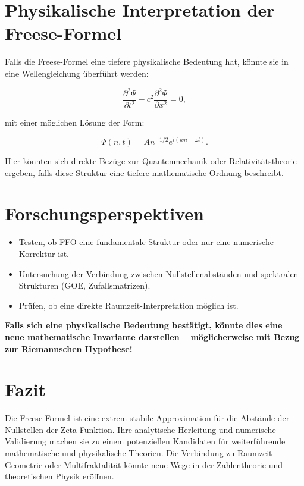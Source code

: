 \documentclass[a4paper,12pt]{article}
\begin{document}
\section{Physikalische Interpretation der Freese-Formel}
Falls die Freese-Formel eine tiefere physikalische Bedeutung hat, könnte sie in eine Wellengleichung überführt werden:

\begin{equation}
    \frac{\partial^2 \Psi}{\partial t^2} - c^2 \frac{\partial^2 \Psi}{\partial x^2} = 0,
\end{equation}

mit einer möglichen Lösung der Form:

\begin{equation}
    \Psi(n, t) = A n^{-1/2} e^{i (w n - \omega t)}.
\end{equation}

Hier könnten sich direkte Bezüge zur Quantenmechanik oder Relativitätstheorie ergeben, falls diese Struktur eine tiefere mathematische Ordnung beschreibt.

\section{Forschungsperspektiven}
\begin{itemize}
    \item Testen, ob FFO eine fundamentale Struktur oder nur eine numerische Korrektur ist.
    \item Untersuchung der Verbindung zwischen Nullstellenabständen und spektralen Strukturen (GOE, Zufallsmatrizen).
    \item Prüfen, ob eine direkte Raumzeit-Interpretation möglich ist.
\end{itemize}

\textbf{Falls sich eine physikalische Bedeutung bestätigt, könnte dies eine neue mathematische Invariante darstellen – möglicherweise mit Bezug zur Riemannschen Hypothese!}

\section{Fazit}
Die Freese-Formel ist eine extrem stabile Approximation für die Abstände der Nullstellen der Zeta-Funktion. Ihre analytische Herleitung und numerische Validierung machen sie zu einem potenziellen Kandidaten für weiterführende mathematische und physikalische Theorien. Die Verbindung zu Raumzeit-Geometrie oder Multifraktalität könnte neue Wege in der Zahlentheorie und theoretischen Physik eröffnen.
\end{document}
